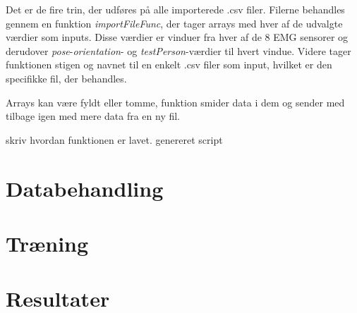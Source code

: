 Det er de fire trin, der udføres på alle importerede .csv filer. Filerne behandles gennem en funktion \textit{importFileFunc}, der tager arrays med hver af de udvalgte værdier som inputs. Disse værdier er vinduer fra hver af de 8 EMG sensorer og derudover \textit{pose}-\textit{orientation}- og \textit{testPerson}-værdier til hvert vindue. Videre tager funktionen stigen og navnet til en enkelt .csv filer som input, hvilket er den specifikke fil, der behandles. 

Arrays kan være fyldt eller tomme, funktion smider data i dem og sender med tilbage igen med mere data fra en ny fil.

skriv hvordan funktionen er lavet. genereret script



\section{Databehandling}

\section{Træning}

\section{Resultater}